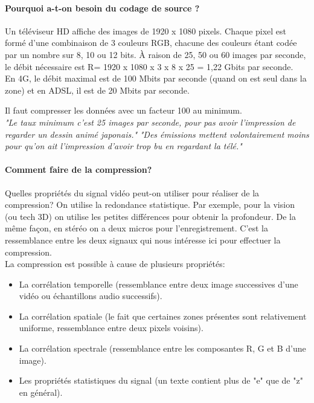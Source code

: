 \documentclass[main.tex]{subfiles}
\begin{document}
\paragraph{Pourquoi a-t-on besoin du codage de source ?}

Un téléviseur HD affiche des images de 1920 x 1080 pixels. Chaque pixel est formé d'une combinaison de 3 couleurs RGB, chacune des couleurs étant codée par un nombre sur 8, 10 ou 12 bits. À raison de 25, 50 ou 60 images par seconde, le débit nécessaire est R= 1920 x 1080 x 3 x 8 x 25 = 1,22 Gbits par seconde. \\

En 4G, le débit maximal est de 100 Mbits par seconde (quand on est seul dans la zone) et en ADSL, il est de 20 Mbits par seconde.

Il faut compresser les données avec un facteur 100 au minimum.\\

\emph{"Le taux minimum c'est 25 images par seconde, pour pas avoir l'impression de regarder un dessin animé japonais."}
\emph{"Des émissions mettent volontairement moins pour qu'on ait l'impression d'avoir trop bu en regardant la télé."}\\

\paragraph{Comment faire de la compression?} Quelles propriétés du signal vidéo peut-on utiliser pour réaliser de la compression?
On utilise la redondance statistique. Par exemple, pour la vision (ou tech 3D) on utilise les petites différences pour obtenir la profondeur. De la même façon, en stéréo on a deux micros pour l'enregistrement. C'est la ressemblance entre les deux signaux qui nous intéresse ici pour effectuer la compression.\\

La compression est possible à cause de plusieurs propriétés:
\begin{itemize}
\item La corrélation temporelle (ressemblance entre deux image successives d'une vidéo ou échantillons audio successifs).
\item La corrélation spatiale (le fait que certaines zones présentes sont relativement uniforme, ressemblance entre deux pixels voisins).
\item La corrélation spectrale (ressemblance entre les composantes R, G et B d'une image).
\item Les propriétés statistiques du signal (un texte contient plus de "e" que de "z" en général).
\end{itemize}
\end{document}
